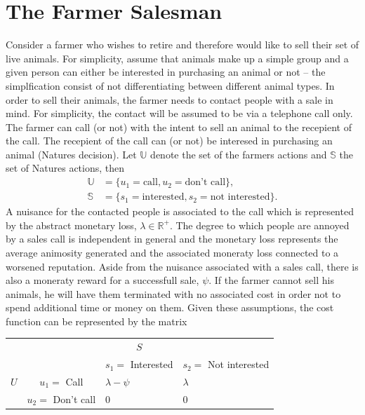 \documentclass[a4paper,11pt, oneside]{article}
\theoremstyle{definition}
\begin{document}
	\section{The Farmer Salesman}		
	Consider a farmer who wishes to retire and therefore would like to sell their set of live animals. For simplicity, assume that animals make up a simple group and a given person can either be interested in purchasing an animal or not -- the simplfication consist of not differentiating between different animal types. In order to sell their animals, the farmer needs to contact people with a sale in mind. For simplicity, the contact will be assumed to be via a telephone call only. The farmer can call (or not) with the intent to sell an animal to the recepient of the call. The recepient of the call can (or not) be interesed in purchasing an animal (Natures decision). Let $\mathbb{U}$ denote the set of the farmers actions and $\mathbb{S}$ the set of Natures actions, then
	\begin{equation}
		\begin{split}
			\mathbb{U} &= \{u_1 = \text{call}, u_2 = \text{don't call}\},\\
			\mathbb{S} &= \{s_1 = \text{interested}, s_2 = \text{not interested}\}.
		\end{split}
	\end{equation}
	A nuisance for the contacted people is associated to the call which is represented by the abstract monetary loss, $\lambda\in \mathbb{R}^+$. The degree to which people are annoyed by a sales call is independent in general and the monetary loss represents the average animosity generated and the associated moneraty loss connected to a worsened reputation. Aside from the nuisance associated with a sales call, there is also a moneraty reward for a successfull sale, $\psi$.	If the farmer cannot sell his animals, he will have them terminated with no associated cost in order not to spend additional time or money on them. Given these assumptions, the cost function can be represented by the matrix
	\begin{center}
		\begin{tabular}{ c  c  c  c }
			&& $S$& \\
			&& $s_1=$ Interested & $s_2=$ Not interested  \\
			\cline{3-4}
			$U$ & $u_1 =$ Call& \multicolumn{1}{|l}{$\lambda-\psi$} &\multicolumn{1}{l|}{$\lambda$}  \\
			& $u_2=$ Don't call& \multicolumn{1}{|l}{$0$} & \multicolumn{1}{l|}{0} \\
			\cline{3-4}
		\end{tabular}
	\end{center}
\end{document}
